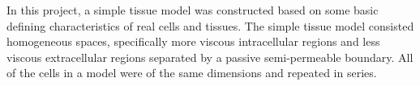 In this project, a simple tissue model was constructed based on some basic defining characteristics of real cells and tissues. The simple tissue model consisted homogeneous spaces, specifically more viscous intracellular regions and less viscous extracellular regions separated by a passive semi-permeable boundary. All of the cells in a model were of the same dimensions and repeated in series.











%
%
%
%
%
%
%
%
%
%
%
%
%
